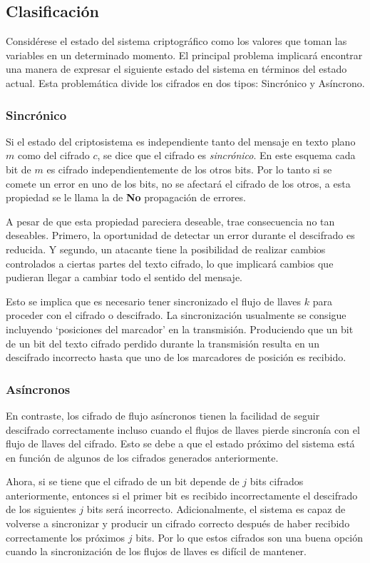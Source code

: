 \subsection{Clasificación}
Considérese el estado del sistema criptográfico como los valores que toman las variables en un determinado momento. El principal problema implicará encontrar una manera de expresar el siguiente estado del sistema  en términos del estado actual. Esta problemática divide los cifrados en dos tipos: Sincrónico y Asíncrono.
\subsubsection{Sincrónico}
Si el estado del criptosistema es independiente tanto del mensaje en texto plano $m$ como del cifrado $c$, se dice que el cifrado es \emph{sincrónico}. En este esquema cada bit de $m$ es cifrado independientemente de los otros bits. Por lo tanto si se comete un error en uno de los bits, no se afectará el cifrado de los otros, a esta propiedad se le llama la de {\bf No} propagación de errores. 

A pesar de que esta propiedad pareciera deseable, trae consecuencia no tan deseables. Primero, la oportunidad de detectar un error durante el descifrado es reducida.  Y segundo, un atacante tiene la posibilidad de realizar cambios controlados a ciertas partes del texto cifrado, lo que implicará cambios que pudieran llegar a cambiar todo el sentido del mensaje.

Esto se implica que es necesario tener sincronizado el flujo de llaves $k$ para proceder con el cifrado o descifrado. La sincronización usualmente se consigue incluyendo `posiciones del marcador' en la transmisión. Produciendo que un bit de un bit del texto cifrado perdido durante la transmisión resulta en un descifrado incorrecto hasta que uno de los marcadores de posición es recibido.
\subsubsection{Asíncronos}
En contraste, los cifrado de flujo asíncronos tienen la facilidad de seguir descifrado correctamente incluso cuando el flujos de llaves pierde sincronía con el flujo de llaves del cifrado. Esto se debe a que el estado próximo del sistema está en función de algunos de los cifrados generados anteriormente.

Ahora, si se tiene que el cifrado de un bit depende de $j$ bits cifrados anteriormente, entonces si el primer bit es recibido incorrectamente el descifrado de los siguientes $j$ bits será incorrecto. Adicionalmente, el sistema es capaz de volverse a sincronizar y producir un cifrado correcto después de haber recibido correctamente los próximos $j$ bits. Por lo que estos cifrados son una buena opción cuando la sincronización de los flujos de llaves es difícil de mantener.

